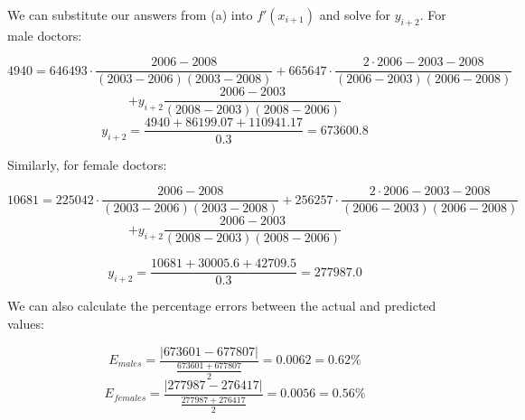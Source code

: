\documentclass[12pt]{article}
\begin{document}
\indent We can substitute our answers from (a) into $f'(x_{i+1})$ and solve for $y_{i+2}$. For male doctors:

$$ 4940 = 646493 \cdot \frac{2006 - 2008}{(2003 - 2006)(2003 - 2008)} + 665647 \cdot  \frac{2\cdot2006 - 2003 - 2008}{(2006 - 2003)(2006 - 2008)} $$
$$ + y_{i+2} \frac{2006 - 2003}{(2008 - 2003)(2008 - 2006)} $$
$$ y_{i+2} = \frac{4940 + 86199.07 + 110941.17}{0.3} = 673600.8 $$

\indent Similarly, for female doctors:

$$ 10681 = 225042 \cdot \frac{2006 - 2008}{(2003 - 2006)(2003 - 2008)} + 256257 \cdot  \frac{2\cdot2006 - 2003 - 2008}{(2006 - 2003)(2006 - 2008)} $$
$$ + y_{i+2} \frac{2006 - 2003}{(2008 - 2003)(2008 - 2006)} $$

$$ y_{i+2} = \frac{10681 + 30005.6 + 42709.5}{0.3} = 277987.0 $$

\indent We can also calculate the percentage errors between the actual and predicted values:

$$ E_{males} = \frac{|673601 - 677807|}{\frac{673601 + 677807}{2}} = 0.0062 = 0.62\% $$
$$ E_{females} = \frac{|277987 - 276417|}{\frac{277987 + 276417}{2}} = 0.0056 = 0.56\% $$
\end{document}
